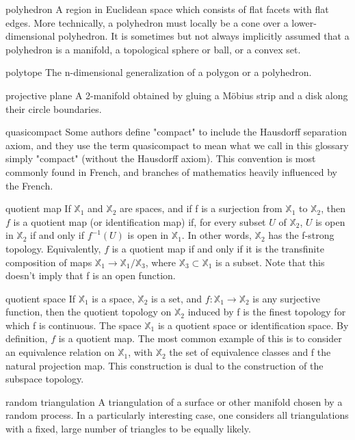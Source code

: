 \begin{description}
\begin{tiny}
\item[polyhedron] A region in Euclidean space which consists of flat facets with flat edges. More technically, a polyhedron must locally be a cone over a lower-dimensional polyhedron. It is sometimes but not always implicitly assumed that a polyhedron is a manifold, a topological sphere or ball, or a convex set.
\item[polytope] The n-dimensional generalization of a polygon or a polyhedron.
\item[projective plane] A 2-manifold obtained by gluing a Möbius strip and a disk along their circle boundaries.
\item[quasicompact] Some authors define "compact" to include the Hausdorff separation axiom, and they use the term quasicompact to mean what we call in this glossary simply "compact" (without the Hausdorff axiom). This convention is most commonly found in French, and branches of mathematics heavily influenced by the French.
\item[quotient map] If $\mathbb{X}_{1}$ and $\mathbb{X}_{2}$ are spaces, and if f is a surjection from $\mathbb{X}_{1}$ to $\mathbb{X}_{2}$, then $f$ is a quotient map (or identification map) if, for every subset $U$ of $\mathbb{X}_{2}$, $U$ is open in $\mathbb{X}_{2}$ if and only if $f^{-1}(U)$ is open in $\mathbb{X}_{1}$. In other words, $\mathbb{X}_{2}$ has the f-strong topology. Equivalently, $f$ is a quotient map if and only if it is the transfinite composition of maps $\mathbb{X}_{1} \rightarrow \mathbb{X}_{1}/\mathbb{X}_{3}$, where $\mathbb{X}_{3} \subset \mathbb{X}_{1}$ is a subset. Note that this doesn't imply that f is an open function.
\item[quotient space] If $\mathbb{X}_{1}$ is a space, $\mathbb{X}_{2}$ is a set, and $f : \mathbb{X}_{1} \rightarrow \mathbb{X}_{2}$ is any surjective function, then the quotient topology on $\mathbb{X}_{2}$ induced by f is the finest topology for which f is continuous. The space $\mathbb{X}_{1}$ is a quotient space or identification space. By definition, $f$ is a quotient map. The most common example of this is to consider an equivalence relation on $\mathbb{X}_{1}$, with $\mathbb{X}_{2}$ the set of equivalence classes and f the natural projection map. This construction is dual to the construction of the subspace topology.
\item[random triangulation] A triangulation of a surface or other manifold chosen by a random process. In a particularly interesting case, one considers all triangulations with a fixed, large number of triangles to be equally likely.

\end{tiny}
\end{description}
